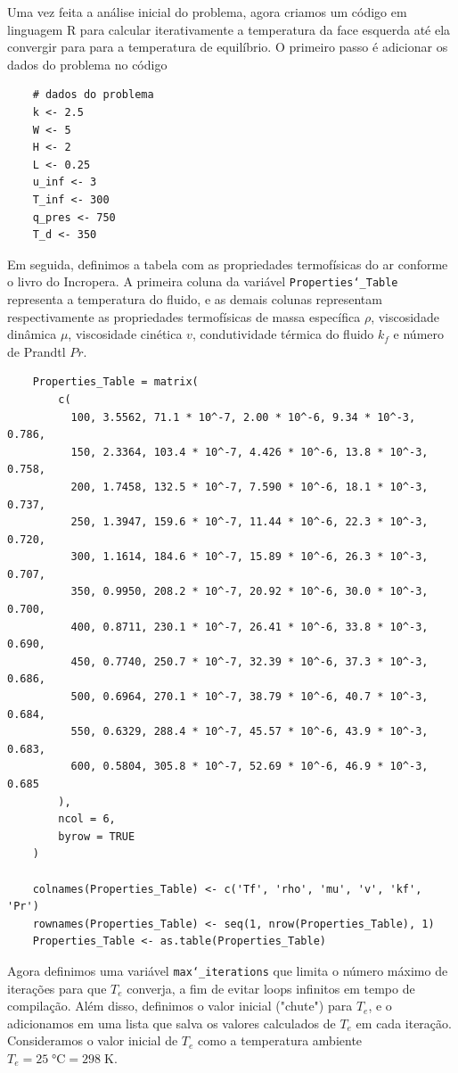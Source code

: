 \documentclass[12pt]{scrartcl}
\newcommand{\un}[1]{\;\textrm{#1}}
\newcommand{\code}[1]{\texttt{#1}}
\begin{document}
Uma vez feita a análise inicial do problema, agora criamos um código em linguagem R para 
calcular iterativamente a temperatura da face esquerda até ela convergir para 
para a temperatura de equilíbrio. O primeiro passo é adicionar os dados do problema no código  

\begin{lstlisting}
    # dados do problema
    k <- 2.5
    W <- 5
    H <- 2
    L <- 0.25
    u_inf <- 3
    T_inf <- 300
    q_pres <- 750
    T_d <- 350
\end{lstlisting}

Em seguida, definimos a tabela com as propriedades termofísicas do ar conforme o livro
do Incropera. A primeira coluna da variável \code{Properties\char`_Table} representa a temperatura do fluido, e as demais colunas representam
respectivamente as propriedades termofísicas de massa específica $\rho$, viscosidade dinâmica $\mu$, viscosidade
cinética $v$, condutividade térmica do fluido $k_f$ e número de Prandtl $Pr$.

\begin{lstlisting}
    Properties_Table = matrix(
        c(
          100, 3.5562, 71.1 * 10^-7, 2.00 * 10^-6, 9.34 * 10^-3, 0.786,
          150, 2.3364, 103.4 * 10^-7, 4.426 * 10^-6, 13.8 * 10^-3, 0.758,
          200, 1.7458, 132.5 * 10^-7, 7.590 * 10^-6, 18.1 * 10^-3, 0.737,
          250, 1.3947, 159.6 * 10^-7, 11.44 * 10^-6, 22.3 * 10^-3, 0.720,
          300, 1.1614, 184.6 * 10^-7, 15.89 * 10^-6, 26.3 * 10^-3, 0.707,
          350, 0.9950, 208.2 * 10^-7, 20.92 * 10^-6, 30.0 * 10^-3, 0.700,
          400, 0.8711, 230.1 * 10^-7, 26.41 * 10^-6, 33.8 * 10^-3, 0.690,
          450, 0.7740, 250.7 * 10^-7, 32.39 * 10^-6, 37.3 * 10^-3, 0.686,
          500, 0.6964, 270.1 * 10^-7, 38.79 * 10^-6, 40.7 * 10^-3, 0.684,
          550, 0.6329, 288.4 * 10^-7, 45.57 * 10^-6, 43.9 * 10^-3, 0.683,
          600, 0.5804, 305.8 * 10^-7, 52.69 * 10^-6, 46.9 * 10^-3, 0.685
        ),
        ncol = 6,
        byrow = TRUE
    )
      
    colnames(Properties_Table) <- c('Tf', 'rho', 'mu', 'v', 'kf', 'Pr')
    rownames(Properties_Table) <- seq(1, nrow(Properties_Table), 1)
    Properties_Table <- as.table(Properties_Table)
\end{lstlisting}

Agora definimos uma variável \code{max\char`_iterations} que limita o número máximo de
iterações para que $T_e$ converja, a fim de evitar loops infinitos em tempo de compilação.
Além disso, definimos o valor inicial ("chute") para $T_e$, e o adicionamos em uma lista
que salva os valores calculados de $T_e$ em cada iteração. Consideramos o valor inicial de
$T_e$ como a temperatura ambiente $T_e = 25 \un{°C} = 298 \un{K}$.
\end{document}
